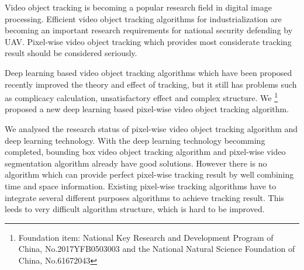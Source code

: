 \begin{eabstract}
	Video object tracking is becoming a popular research field in digital image processing. Efficient video object tracking algorithms for industrialization are becoming an important research requirements for national security defending by UAV. Pixel-wise video object tracking which provides most considerate tracking result should be considered seriously.
	\par
	Deep learning based video object tracking algorithms which have been proposed recently improved the theory and effect of tracking, but it still has problems such as complicacy calculation, unsatisfactory effect and complex structure. 
	We \footnote{Foundation item: National Key Research and Development Program of China, No.2017YFB0503003 and the National Natural Science Foundation of China, No.61672043}
	proposed a new deep learning based pixel-wise video object tracking algorithm.
	\par
	We analysed the research status of pixel-wise video object tracking algorithm and deep learning technology. With the deep learning technology becomming completed, bounding box video object tracking algorithm and pixel-wise video segmentation algorithm already have good solutions. However there is no algorithm which can provide perfect pixel-wise tracking result by well combining time and space information. Existing pixel-wise tracking algorithms have to integrate several different purposes algorithms to achieve tracking result. This leeds to very difficult algorithm structure, which is hard to be improved.

\end{eabstract}
